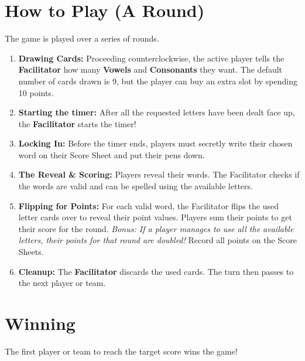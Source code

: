 \documentclass[a4paper,11pt]{article}
\newcommand{\emptypage}{
	\clearpage
	\thispagestyle{empty}
	\hfill
	\clearpage
}
\begin{document}
	\section*{How to Play (A Round)}
	The game is played over a series of rounds.
	\begin{enumerate}
		\item \textbf{Drawing Cards:} Proceeding counterclockwise, the active player tells the \textbf{Facilitator} how many \textbf{Vowels} and \textbf{Consonants} they want. The default number of cards drawn is 9, but the player can buy an extra slot by spending 10 points.
		\item \textbf{Starting the timer:} After all the requested letters have been dealt face up, the \textbf{Facilitator} starts the timer!   
		\item \textbf{Locking In:} Before the timer ends, players must secretly write their chosen word on their Score Sheet and put their pens down.
		\item \textbf{The Reveal \& Scoring:} Players reveal their words. The Facilitator checks if the words are valid and can be spelled using the available letters. 
		\item \textbf{Flipping for Points:} For each valid word, the Facilitator flips the used letter cards over to reveal their point values. Players sum their points to get their score for the round. \textit{Bonus: If a player manages to use all the available letters, their points for that round are doubled!} Record all points on the Score Sheets.
		\item \textbf{Cleanup:} The \textbf{Facilitator} discards the used cards. The turn then passes to the next player or team.
	\end{enumerate}
	
	\section*{Winning}
	The first player or team to reach the target score wins the game! 
	
	\newpage
	
	\emptypage
	
	
\end{document}
